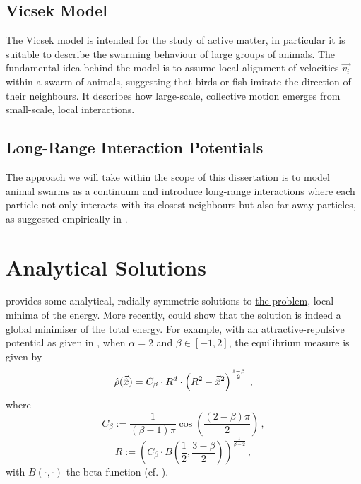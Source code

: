 \subsection{Vicsek Model}
The Vicsek model \parencite{1995-vicsek-model} is intended for the study of active matter, in particular it is suitable to describe the swarming behaviour of large groups of animals.
The fundamental idea behind the model is to assume local alignment of velocities $\vec{v_i}$ within a swarm of animals, suggesting that birds or fish imitate the direction of their neighbours.
It describes how large-scale, collective motion emerges from small-scale, local interactions.

\subsection{Long-Range Interaction Potentials}
The approach we will take within the scope of this dissertation is to model animal swarms as a continuum and introduce long-range interactions where each particle not only interacts with its closest neighbours but also far-away particles, as suggested empirically in \cite{2010-starlings}.

\section{Analytical Solutions}
\label{sec:analytical-solutions}
\cite{2017-explicit-solutions} provides some analytical, radially symmetric solutions to \hyperref[def:the-problem]{the problem}, local minima of the energy.
More recently, \cite{2021-carrillo-radial} could show that the solution is indeed a global minimiser of the total energy.
For example, with an attractive-repulsive potential as given in , when $\alpha = 2$ and $\beta \in [-1, 2]$, the equilibrium measure is given by
\begin{equation}
  \hat{\rho}(\vec{\hat{x}}) = C_\beta \cdot R^d \cdot \left(R^2 - \vec{\hat{x}}^2\right)^{\frac{1-\beta}{2}}\,,
  \label{eq:analytical-solution-alpha-equal-2}
\end{equation}
where
$$C_\beta := \frac{1}{(\beta - 1) \pi} \cos\left(\frac{(2 - \beta) \pi}{2}\right)\,,$$
$$R := \left(C_\beta \cdot B\left(\frac{1}{2}, \frac{3 - \beta}{2}\right)\right)^{\frac{1}{\beta - 2}}\,,$$
with $B(\cdot, \cdot)$ the beta-function (cf. ).

